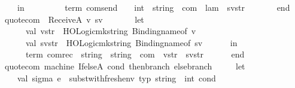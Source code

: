\begin{isabellebody}
\ \ \ \ \ \ in\ \isanewline
\ \ \ \ \ \ \ \ {\isacharat}{\kern0pt}{\isacharbraceleft}{\kern0pt}term\ {\isachardoublequote}{\kern0pt}com{\isachardot}{\kern0pt}send\ {\isacharcolon}{\kern0pt}{\isacharcolon}{\kern0pt}\ {\isacharparenleft}{\kern0pt}{\isasymsigma}\ {\isasymRightarrow}\ int{\isacharparenright}{\kern0pt}\ {\isasymRightarrow}\ string\ {\isasymRightarrow}\ com{\isachardoublequote}{\kern0pt}{\isacharbraceright}{\kern0pt}\ {\isachardollar}{\kern0pt}\ lam\ {\isachardollar}{\kern0pt}\ sv{\isacharunderscore}{\kern0pt}str\isanewline
\ \ \ \ \ \ \ end\isanewline
\isanewline
\ \ {\isacharbar}{\kern0pt}\ quote{\isacharunderscore}{\kern0pt}com\ {\isacharunderscore}{\kern0pt}\ {\isacharparenleft}{\kern0pt}ReceiveA\ {\isacharparenleft}{\kern0pt}v{\isacharcomma}{\kern0pt}\ sv{\isacharparenright}{\kern0pt}{\isacharparenright}{\kern0pt}\ {\isacharequal}{\kern0pt}\isanewline
\ \ \ \ \ \ let\isanewline
\ \ \ \ \ \ \ \ val\ v{\isacharunderscore}{\kern0pt}str\ {\isacharequal}{\kern0pt}\ HOLogic{\isachardot}{\kern0pt}mk{\isacharunderscore}{\kern0pt}string\ {\isacharparenleft}{\kern0pt}Binding{\isachardot}{\kern0pt}name{\isacharunderscore}{\kern0pt}of\ v{\isacharparenright}{\kern0pt}\isanewline
\ \ \ \ \ \ \ \ val\ sv{\isacharunderscore}{\kern0pt}str\ {\isacharequal}{\kern0pt}\ HOLogic{\isachardot}{\kern0pt}mk{\isacharunderscore}{\kern0pt}string\ {\isacharparenleft}{\kern0pt}Binding{\isachardot}{\kern0pt}name{\isacharunderscore}{\kern0pt}of\ sv{\isacharparenright}{\kern0pt}\isanewline
\ \ \ \ \ \ in\isanewline
\ \ \ \ \ \ \ \ {\isacharat}{\kern0pt}{\isacharbraceleft}{\kern0pt}term\ {\isachardoublequote}{\kern0pt}com{\isachardot}{\kern0pt}rec\ {\isacharcolon}{\kern0pt}{\isacharcolon}{\kern0pt}\ string\ {\isasymRightarrow}\ string\ {\isasymRightarrow}\ com{\isachardoublequote}{\kern0pt}{\isacharbraceright}{\kern0pt}\ {\isachardollar}{\kern0pt}\ v{\isacharunderscore}{\kern0pt}str\ {\isachardollar}{\kern0pt}\ sv{\isacharunderscore}{\kern0pt}str\isanewline
\ \ \ \ \ \ end\isanewline
\ \ {\isacharbar}{\kern0pt}\ quote{\isacharunderscore}{\kern0pt}com\ machine\ {\isacharparenleft}{\kern0pt}IfelseA\ {\isacharparenleft}{\kern0pt}{\isacharparenleft}{\kern0pt}cond{\isacharcomma}{\kern0pt}\ then{\isacharunderscore}{\kern0pt}branch{\isacharparenright}{\kern0pt}{\isacharcomma}{\kern0pt}\ else{\isacharunderscore}{\kern0pt}branch{\isacharparenright}{\kern0pt}{\isacharparenright}{\kern0pt}\ {\isacharequal}{\kern0pt}\isanewline
\ \ \ \ let\isanewline
\ \ \ \ \ {\isacharparenleft}{\kern0pt}{\isacharasterisk}{\kern0pt}\ val\ {\isacharparenleft}{\kern0pt}sigma{\isacharcomma}{\kern0pt}\ e{\isacharprime}{\kern0pt}{\isacharparenright}{\kern0pt}\ {\isacharequal}{\kern0pt}\ subst{\isacharunderscore}{\kern0pt}with{\isacharunderscore}{\kern0pt}fresh{\isacharunderscore}{\kern0pt}env\ {\isacharat}{\kern0pt}{\isacharbraceleft}{\kern0pt}typ\ {\isachardoublequote}{\kern0pt}string\ {\isasymRightarrow}\ int{\isachardoublequote}{\kern0pt}{\isacharbraceright}{\kern0pt}\ cond\isanewline

\end{isabellebody}
